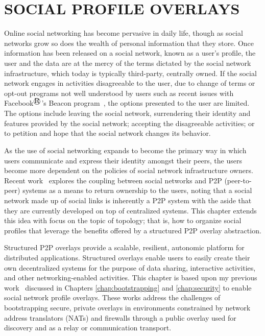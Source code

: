\chapter{SOCIAL PROFILE OVERLAYS}
\label{chap:spo}

Online social networking has become pervasive in daily life, though as social
networks grow so does the wealth of personal information that they store.  Once
information has been released on a social network, known as a user's profile,
the user and the data are at the mercy of the terms dictated by the social
network infrastructure, which today is typically third-party, centrally owned.
If the social network engages in activities disagreeable to the user, due to
change of terms or opt-out programs not well understood by users such as recent
issues with Facebook$^\registered$'s Beacon program~\cite{facebook_beacon}, the options
presented to the user are limited.  The options include leaving the social
network, surrendering their identity and features provided by the social
network; accepting the disagreeable activities; or to petition and hope that
the social network changes its behavior. 

As the use of social networking expands to become the primary way in which
users communicate and express their identity amongst their peers, the users
become more dependent on the policies of social network infrastructure owners.
Recent work~\cite{p2p_socialnetwork} explores the coupling between social
networks and P2P (peer-to-peer) systems as a means to return ownership to the
users, noting that a social network made up of social links is inherently a P2P
system with the aside that they are currently developed on top of centralized
systems.  This chapter extends this idea with focus on the topic of topology;
that is, how to organize social profiles that leverage the benefits offered by
a structured P2P overlay abstraction.

Structured P2P overlays provide a scalable, resilient, autonomic platform for
distributed applications.  Structured overlays enable users to easily create
their own decentralized systems for the purpose of data sharing, interactive
activities, and other networking-enabled activities.  This chapter is based
upon my previous work~\cite{groupvpn, bootstrapping} discussed in Chapters
\ref{chap:bootstrapping} and \ref{chap:security} to enable social network
profile overlays.  These works address the challenges of bootstrapping secure,
private overlays in environments constrained by network address translators
(NATs) and firewalls through a public overlay used for discovery and as a relay
or communication transport.  


